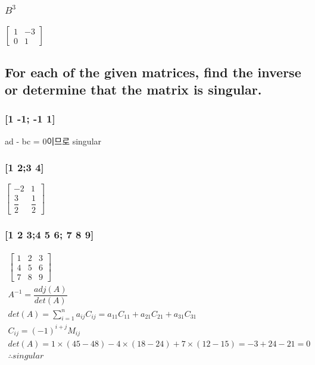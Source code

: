 \documentclass[12pt,a4paper]{article}
\begin{document}
\subsubsection{$B^3$}
$
\begin{bmatrix}
1 &-3\\0&1
\end{bmatrix}
$
\subsection{For each of the given matrices, find the inverse or determine that the matrix is singular.}

\subsubsection{[1 -1; -1 1]} 
ad - bc = 0이므로 singular
\subsubsection{[1 2;3 4]}
$
\begin{bmatrix}
	-2 &1\\ \dfrac{3}{2} & \dfrac{1}{2}
\end{bmatrix}
$
\subsubsection{[1 2 3;4 5 6; 7 8 9]}
\begin{gather*}
\begin{bmatrix}
	1&2&3\\4&5&6\\7&8&9
\end{bmatrix}\\
A^{-1} = \dfrac{adj(A)}{det(A)}\\
det(A) = \displaystyle\sum_{i=1}^{n}a_{ij}C_{ij}=a_{11}C_{11}+a_{21}C_{21}+a_{31}C_{31}\\
C_{ij} = (-1)^{i+j}M_{ij}\\
det(A)=1\times (45-48) - 4\times (18-24) + 7\times (12-15) = -3 + 24 -21 = 0\\
\therefore singular
\end{gather*}
\end{document}
